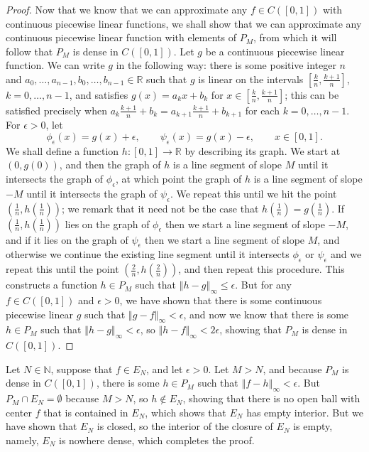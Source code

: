\documentclass{article}
\newcommand{\norm}[1]{\left\Vert #1 \right\Vert}
\theoremstyle{definition}
\begin{document}
\begin{proof}
Now that we know that we can approximate any $f \in C([0,1])$ with continuous piecewise linear functions, we 
shall show that we can approximate any continuous piecewise linear function with  elements of $P_M$, from which it will follow
that $P_M$ is dense in $C([0,1])$. Let $g$ be a continuous piecewise linear function. We can write
$g$ in the following way: there is some positive integer $n$ and $a_0,\ldots,a_{n-1}, b_0,\ldots,b_{n-1} \in \mathbb{R}$ such that
 $g$ is linear on the intervals $[\frac{k}{n},\frac{k+1}{n}]$, $k=0,\ldots,n-1$, and 
satisfies $g(x)=a_kx+b_k$ for $x \in [\frac{k}{n},\frac{k+1}{n}]$; this can be satisfied  precisely when
$a_k \frac{k+1}{n}+b_k = a_{k+1}\frac{k+1}{n}+b_{k+1}$ for each $k=0,\ldots,n-1$. 
For $\epsilon>0$,
let
\[
\phi_\epsilon(x)=g(x)+\epsilon, \qquad \psi_\epsilon(x)=g(x)-\epsilon, \qquad x \in [0,1].
\]
We shall define a function $h:[0,1] \to \mathbb{R}$ by describing its graph.
We start at $(0,g(0))$, and then the graph of $h$ is a line segment of slope $M$ until it intersects the graph of $\phi_\epsilon$, at which
point the graph of $h$ is a line segment of slope $-M$ until it intersects the graph of $\psi_\epsilon$. We repeat this until we hit
the point $(\frac{1}{n},h(\frac{1}{n}))$; we remark that it need not be the case that  $h(\frac{1}{n})=g(\frac{1}{n})$. If $(\frac{1}{n},h(\frac{1}{n}))$
lies on the graph of $\phi_\epsilon$ then we start a line segment of slope $-M$, and if it lies on the graph
of $\psi_\epsilon$ then we start a line segment of slope $M$, and otherwise we continue the existing line segment until it intersects
$\phi_\epsilon$ or $\psi_\epsilon$ and we repeat this until the point $(\frac{2}{n},h(\frac{2}{n}))$, and then repeat this procedure.
This constructs a function $h \in P_M$ such that $\norm{h-g}_\infty \leq \epsilon$. But for any $f \in C([0,1])$ and $\epsilon>0$,
we have shown that there is some continuous piecewise linear $g$ such that $\norm{g-f}_\infty < \epsilon$, and now we know that there
is some $h \in P_M$ such that $\norm{h-g}_\infty<\epsilon$, so $\norm{h-f}_\infty < 2 \epsilon$, showing that $P_M$ is dense in
$C([0,1])$.
\end{proof}

Let $N \in \mathbb{N}$,
suppose that $f \in E_N$, and let $\epsilon>0$. Let $M>N$, and because $P_M$ is dense in $C([0,1])$,
there is some $h \in P_M$ such that $\norm{f-h}_\infty<\epsilon$.
But $P_M \cap E_N = \emptyset$ because $M>N$, so $h \not \in E_N$, showing that there is no open ball
with center $f$ that is contained in $E_N$, which shows that $E_N$ has empty interior.
But we have shown that $E_N$ is closed, so the interior of the closure of $E_N$ is empty, namely,
$E_N$ is nowhere dense, which completes the proof.
\end{document}
